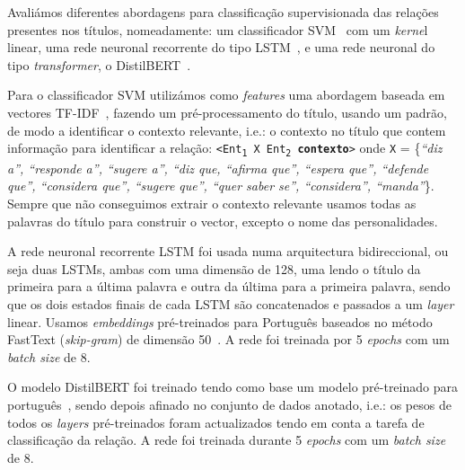 \documentclass[a4paper, twocolumn, 11pt, twoside]{article}
\begin{document}
Avaliámos diferentes abordagens para classificação supervisionada das relações presentes nos títulos, nomeadamente: um classificador SVM~\citep{cortes1995support} com um \textit{kerne}l linear, uma rede neuronal recorrente do tipo LSTM~\citep{10.1162/neco.1997.9.8.1735}, e uma rede neuronal do tipo \textit{transformer}, o DistilBERT~\citep{9463516}.

Para o classificador SVM utilizámos como \textit{features} uma abordagem baseada em vectores TF-IDF~\citep{DBLP:journals/ipm/SaltonB88}, fazendo um pré-processamento do título, usando um padrão, de modo a identificar o contexto relevante, i.e.: o contexto no título que contem informação para identificar a relação: \texttt{<Ent\textsubscript{1} X Ent\textsubscript{2} \textbf{contexto}>} onde \texttt{X} = \{\textit{“diz a”, “responde a”, “sugere a”, “diz que, “afirma que”, “espera que”, “defende que”, “considera que”, “sugere que”, “quer saber se”, “considera”, “manda”}\}. Sempre que não conseguimos extrair o contexto relevante usamos todas as palavras do título para construir o vector, excepto o nome das personalidades.

A rede neuronal recorrente LSTM foi usada numa arquitectura bidireccional, ou seja duas LSTMs, ambas com uma dimensão de 128, uma lendo o título da primeira para a última palavra e outra da última para a primeira palavra, sendo que os dois estados finais de cada LSTM são concatenados e passados a um \textit{layer} linear. Usamos \textit{embeddings} pré-treinados para Português baseados no método FastText (\textit{skip-gram}) de dimensão 50~\citep{hartmann-etal-2017-portuguese}. A rede foi treinada por 5 \textit{epochs} com um \textit{batch size} de 8.

O modelo DistilBERT foi treinado tendo como base um modelo pré-treinado para português~\citep{abdaoui-etal-2020-load}, sendo depois afinado no conjunto de dados anotado, i.e.: os pesos de todos os \textit{layers} pré-treinados foram actualizados tendo em conta a tarefa de classificação da relação. A rede foi treinada durante 5 \textit{epochs} com um \textit{batch size} de 8.
\end{document}
